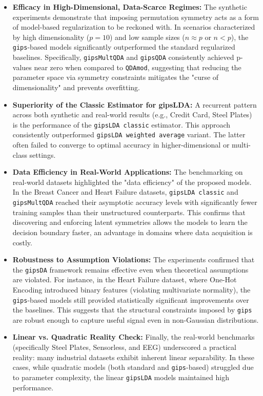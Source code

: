 \documentclass[a4paper,11pt,twoside]{report}
\theoremstyle{definition}
\begin{document}
\begin{itemize}
    \item \textbf{Efficacy in High-Dimensional, Data-Scarce Regimes:}
    The synthetic experiments  demonstrate that imposing permutation symmetry acts as a form of model-based regularization to be reckoned with. In scenarios characterized by high dimensionality ($p=10$) and low sample sizes ($n \approx p$ or $n < p$), the \texttt{gips}-based models significantly outperformed the standard regularized baselines. Specifically, \texttt{gipsMultQDA} and \texttt{gipsQDA} consistently achieved p-values near zero when compared to \texttt{QDAmod}, suggesting that reducing the parameter space via symmetry constraints  mitigates the "curse of dimensionality" and prevents overfitting.

    \item \textbf{Superiority of the Classic Estimator for gipsLDA:}
    A recurrent pattern across both synthetic and real-world results (e.g., Credit Card, Steel Plates) is the performance of the \texttt{gipsLDA classic} estimator. This approach consistently outperformed \texttt{gipsLDA weighted average} variant. The latter often failed to converge to optimal accuracy in higher-dimensional or multi-class settings.

    \item \textbf{Data Efficiency in Real-World Applications:}
    The benchmarking on real-world datasets highlighted the "data efficiency" of the proposed models. In the Breast Cancer and Heart Failure datasets, \texttt{gipsLDA classic} and \texttt{gipsMultQDA} reached their asymptotic accuracy levels with significantly fewer training samples than their unstructured counterparts. This confirms that discovering and enforcing latent symmetries allows the models to learn the decision boundary faster, an advantage in domains where data acquisition is costly.

    \item \textbf{Robustness to Assumption Violations:}
    The experiments confirmed that the \texttt{gipsDA} framework remains effective even when theoretical assumptions are violated. For instance, in the Heart Failure dataset, where One-Hot Encoding introduced binary features (violating multivariate normality), the \texttt{gips}-based models still provided statistically significant improvements over the baselines. This suggests that the structural constraints imposed by \texttt{gips} are robust enough to capture useful signal even in non-Gaussian distributions.

    \item \textbf{Linear vs. Quadratic Reality Check:}
    Finally, the real-world benchmarks (specifically Steel Plates, Sensorless, and EEG) underscored a practical reality: many industrial datasets exhibit inherent linear separability. In these cases, while quadratic models (both standard and \texttt{gips}-based) struggled due to parameter complexity, the linear \texttt{gipsLDA} models maintained high performance.
\end{itemize}
\end{document}
